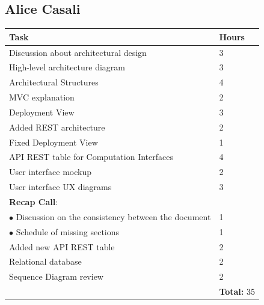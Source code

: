 \documentclass{report}
\begin{document}
\subsection*{Alice Casali}
\begin{table}[!ht]
	\begin{tabular}{|C{.60\textwidth}||C{.20\textwidth}|}
		\toprule
        \textbf{Task} & \textbf{Hours}\\
        \midrule
        Discussion about architectural design & 3\\
        \midrule
        High-level architecture diagram & 3\\
        \midrule
        Architectural Structures & 4\\
        \midrule
        MVC explanation & 2\\
        \midrule
        Deployment View & 3\\
        \midrule
        Added REST architecture & 2 \\
        \midrule
        Fixed Deployment View & 1\\
        \midrule
        API REST table for Computation Interfaces & 4\\
		\midrule
		User interface mockup & 2\\
        \midrule
        User interface UX diagrams & 3\\
        \midrule
		\small{\textbf{Recap Call}}: & \\
		\vspace{.2mm}
		$\bullet$ Discussion on the consistency between the document & \vspace{.2mm} 1\\
        $\bullet$ Schedule of missing sections & 1\\
        \midrule
        Added new API REST table & 2\\
        \midrule
        Relational database & 2\\
        \midrule
		Sequence Diagram review & 2\\
		\midrule
		& \textbf{Total:} 35\\
		\bottomrule
	\end{tabular}
\end{table}
\end{document}
